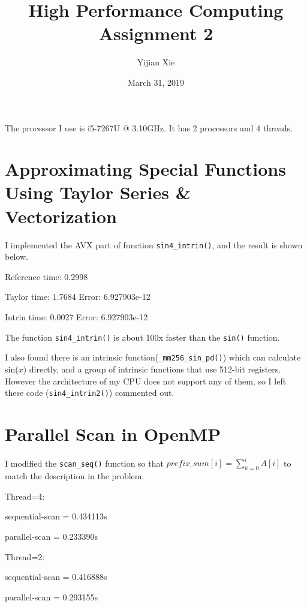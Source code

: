 \documentclass[12pt]{article}
\title{High Performance Computing Assignment 2}
\author{Yijian Xie}
\date{March 31, 2019}
\begin{document}
\maketitle
The processor I use is i5-7267U @ 3.10GHz. It has 2 processors and 4 threads.

\section{Approximating Special Functions Using Taylor Series \& Vectorization}
    I implemented the AVX part of function \verb|sin4_intrin()|, and the result is shown below.

    Reference time: 0.2998

    Taylor time:    1.7684      Error: 6.927903e-12

    Intrin time:    0.0027      Error: 6.927903e-12

    The function \verb|sin4_intrin()| is about 100x faster than the \verb|sin()| function.

    I also found there is an intrinsic function(\verb|_mm256_sin_pd()|) which can calculate sin($x$) directly, and a group of intrinsic functions that use 512-bit registers. However the architecture of my CPU does not support any of them, so I left these code (\verb|sin4_intrin2()|) commented out.

\section{Parallel Scan in OpenMP}
    I modified the \verb|scan_seq()| function so that $prefix\_sum[i] = \sum_{k=0}^{i}A[i]$ to match the description in the problem.

    Thread=4:

    sequential-scan = 0.434113s

    parallel-scan   = 0.233390s

    Thread=2:

    sequential-scan = 0.416888s
    
    parallel-scan   = 0.293155s
\end{document}
